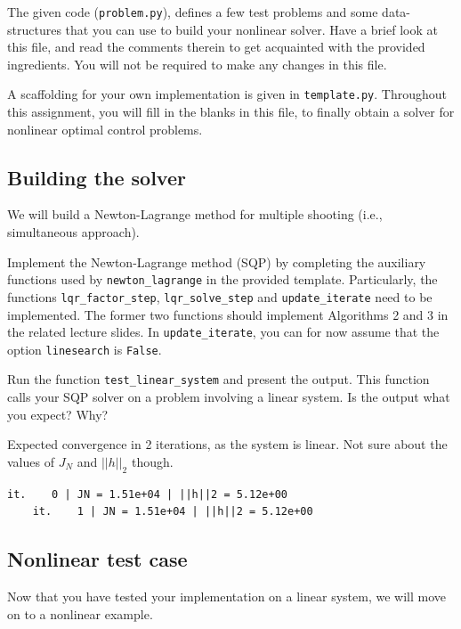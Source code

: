 \documentclass[]{article}
\begin{document}
The given code (\texttt{problem.py}), 
defines a few test problems and some data-structures that 
you can use to build your nonlinear solver. Have a brief 
look at this file, and read the comments therein
to get acquainted with the provided ingredients.
You will not be required to make any changes 
in this file.  

A scaffolding for your own implementation is given 
in \texttt{template.py}. Throughout this 
assignment, you will fill in the blanks in this file, 
to finally obtain a solver for nonlinear optimal control problems.

\subsection{Building the solver}
We will build a Newton-Lagrange method 
for multiple shooting (i.e., simultaneous approach).

\begin{assignment}
	Implement the Newton-Lagrange method (SQP) by 
	completing the auxiliary functions used by \texttt{newton\_lagrange} in 
	the provided template. Particularly, 
	the functions \texttt{lqr\_factor\_step}, \texttt{lqr\_solve\_step}
	and \texttt{update\_iterate} need to be implemented. The former two functions should implement 
	Algorithms 2 and 3 in the related lecture slides. 
	In \texttt{update\_iterate}, you can for now assume that the option \texttt{linesearch} is \texttt{False}.

	Run the function \texttt{test\_linear\_system} and present the output.
	This function calls your SQP solver on a problem involving 
	a linear system. Is the output what you expect? Why?
\end{assignment}
\begin{flushleft}
	Expected convergence in 2 iterations, as the system is linear.
	Not sure about the values of $J_N$ and $||h||_2$ though.
\end{flushleft}
\begin{lstlisting}[style=python]
	it.    0 | JN = 1.51e+04 | ||h||2 = 5.12e+00
	it.    1 | JN = 1.51e+04 | ||h||2 = 5.12e+00
\end{lstlisting}


\subsection{Nonlinear test case}
Now that you have tested your implementation on a linear system,
we will move on to a nonlinear example.
\end{document}
